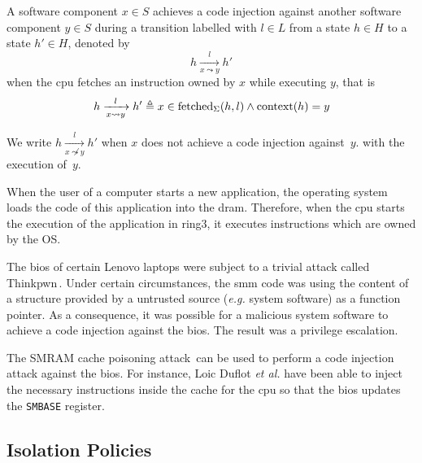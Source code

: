 \begin{definition}
  \label{def:speccert:tempering}
  A software component $x \in S$ achieves a code injection against another
  software component $y \in S$ during a transition labelled with $l \in L$ from
  a state $h \in H$ to a state $h' \in H$, denoted by
  \[
    h \xrightarrow[x \leadsto y]{l} h'
  \]
  when the \ac{cpu} fetches an instruction owned by $x$ while executing $y$,
  that is
  \[
    h \xrightarrow[x \leadsto y]{l} h' \triangleq x \in
    \mathrm{fetched}_{\Sigma}(h, l) \wedge \mathrm{context}(h) = y
  \]

  We write $h \xrightarrow[x \not\leadsto y]{l} h'$ when $x$ does not achieve a
  code injection against~$y$.  with the execution of~$y$.
\end{definition}

\begin{example}
  When the user of a computer starts a new application, the operating system
  loads the code of this application into the \ac{dram}. Therefore, when the
  \ac{cpu} starts the execution of the application in ring3, it executes
  instructions which are owned by the OS.
\end{example}

\begin{example}
  The \ac{bios} of certain Lenovo laptops were subject to a trivial attack
  called Thinkpwn\,\cite{cr4sh2016thinkpwn}.
  Under certain circumstances, the \ac{smm} code was using the content of a
  structure provided by a untrusted source (\emph{e.g.} system software) as a
  function pointer.
  As a consequence, it was possible for a malicious system software to achieve a
  code injection against the \ac{bios}.
  The result was a privilege escalation.
\end{example}

\begin{example}
  The SMRAM cache poisoning attack\,\cite{duflot2009smram,wojtczuk2009smram} can
  be used to perform a code injection attack against the \ac{bios}. For
  instance, Loic Duflot \emph{et al.} have been able to inject the necessary
  instructions inside the cache for the \ac{cpu} so that the \ac{bios} updates
  the \texttt{SMBASE} register.
\end{example}

\subsection{Isolation Policies}
\label{subsec:speccert2:globalsec}

